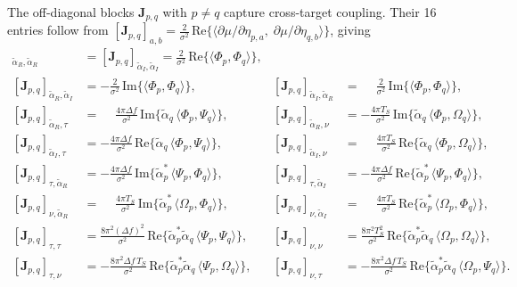 \documentclass[11pt]{article}
\begin{document}
The off-diagonal blocks \(\bm{J}_{p,q}\) with \(p\neq q\) capture
cross-target coupling. Their 16 entries follow from
\([\bm{J}_{p,q}]_{a,b} = \tfrac{2}{\sigma^2}\,
\text{Re}\{\langle \partial\mu/\partial\eta_{p,a},\;\partial\mu/\partial\eta_{q,b}\rangle\}\),
giving
\begin{align}
    [\bm{J}_{p,q}]_{\tilde{\alpha}_R,\tilde{\alpha}_R} &=
        [\bm{J}_{p,q}]_{\tilde{\alpha}_I,\tilde{\alpha}_I} =
        \tfrac{2}{\sigma^2}\,\text{Re}\{\langle \Phi_p,\Phi_q\rangle\}, \\
    [\bm{J}_{p,q}]_{\tilde{\alpha}_R,\tilde{\alpha}_I} &=
        -\tfrac{2}{\sigma^2}\,\text{Im}\{\langle \Phi_p,\Phi_q\rangle\}, &
    [\bm{J}_{p,q}]_{\tilde{\alpha}_I,\tilde{\alpha}_R} &=
        \phantom{-}\tfrac{2}{\sigma^2}\,\text{Im}\{\langle \Phi_p,\Phi_q\rangle\}, \\
    [\bm{J}_{p,q}]_{\tilde{\alpha}_R,\tau} &=
        \phantom{-}\tfrac{4\pi\Delta f}{\sigma^2}\,
        \text{Im}\{\tilde{\alpha}_q\,\langle \Phi_p,\Psi_q\rangle\}, &
    [\bm{J}_{p,q}]_{\tilde{\alpha}_R,\nu} &=
        -\tfrac{4\pi T_S}{\sigma^2}\,
        \text{Im}\{\tilde{\alpha}_q\,\langle \Phi_p,\Omega_q\rangle\}, \\
    [\bm{J}_{p,q}]_{\tilde{\alpha}_I,\tau} &=
        -\tfrac{4\pi\Delta f}{\sigma^2}\,
        \text{Re}\{\tilde{\alpha}_q\,\langle \Phi_p,\Psi_q\rangle\}, &
    [\bm{J}_{p,q}]_{\tilde{\alpha}_I,\nu} &=
        \phantom{-}\tfrac{4\pi T_S}{\sigma^2}\,
        \text{Re}\{\tilde{\alpha}_q\,\langle \Phi_p,\Omega_q\rangle\}, \\
    [\bm{J}_{p,q}]_{\tau,\tilde{\alpha}_R} &=
        -\tfrac{4\pi\Delta f}{\sigma^2}\,
        \text{Im}\{\tilde{\alpha}_p^*\,\langle \Psi_p,\Phi_q\rangle\}, &
    [\bm{J}_{p,q}]_{\tau,\tilde{\alpha}_I} &=
        -\tfrac{4\pi\Delta f}{\sigma^2}\,
        \text{Re}\{\tilde{\alpha}_p^*\,\langle \Psi_p,\Phi_q\rangle\}, \\
    [\bm{J}_{p,q}]_{\nu,\tilde{\alpha}_R} &=
        \phantom{-}\tfrac{4\pi T_S}{\sigma^2}\,
        \text{Im}\{\tilde{\alpha}_p^*\,\langle \Omega_p,\Phi_q\rangle\}, &
    [\bm{J}_{p,q}]_{\nu,\tilde{\alpha}_I} &=
        \phantom{-}\tfrac{4\pi T_S}{\sigma^2}\,
        \text{Re}\{\tilde{\alpha}_p^*\,\langle \Omega_p,\Phi_q\rangle\}, \\
    [\bm{J}_{p,q}]_{\tau,\tau} &=
        \tfrac{8\pi^2 (\Delta f)^2}{\sigma^2}\,
        \text{Re}\{\tilde{\alpha}_p^*\tilde{\alpha}_q\,\langle \Psi_p,\Psi_q\rangle\}, &
    [\bm{J}_{p,q}]_{\nu,\nu} &=
        \tfrac{8\pi^2 T_S^2}{\sigma^2}\,
        \text{Re}\{\tilde{\alpha}_p^*\tilde{\alpha}_q\,\langle \Omega_p,\Omega_q\rangle\}, \\
    [\bm{J}_{p,q}]_{\tau,\nu} &=
        -\tfrac{8\pi^2 \Delta f\, T_S}{\sigma^2}\,
        \text{Re}\{\tilde{\alpha}_p^*\tilde{\alpha}_q\,\langle \Psi_p,\Omega_q\rangle\}, &
    [\bm{J}_{p,q}]_{\nu,\tau} &=
        -\tfrac{8\pi^2 \Delta f\, T_S}{\sigma^2}\,
        \text{Re}\{\tilde{\alpha}_p^*\tilde{\alpha}_q\,\langle \Omega_p,\Psi_q\rangle\}.
\end{align}
\end{document}
